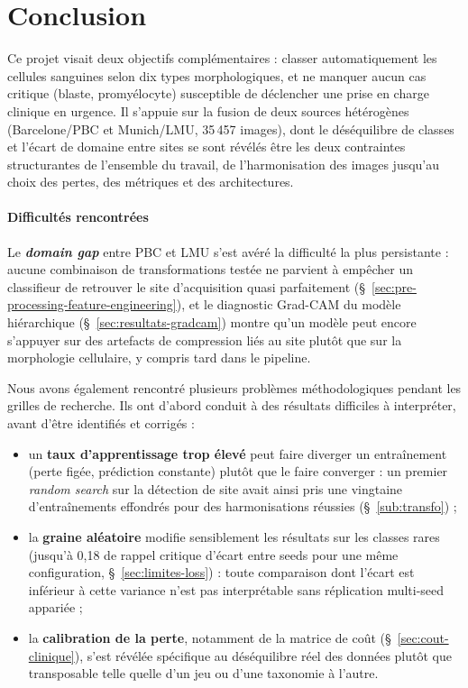 \section{Conclusion}

Ce projet visait deux objectifs complémentaires : classer automatiquement les cellules sanguines selon dix types morphologiques, et ne manquer aucun cas critique (blaste, promyélocyte) susceptible de déclencher une prise en charge clinique en urgence.
Il s'appuie sur la fusion de deux sources hétérogènes (Barcelone/PBC et Munich/LMU, 35\,457 images), dont le déséquilibre de classes et l'écart de domaine entre sites se sont révélés être les deux contraintes structurantes de l'ensemble du travail, de l'harmonisation des images jusqu'au choix des pertes, des métriques et des architectures.

\paragraph{Difficultés rencontrées}

Le \textbf{\emph{domain gap}} entre PBC et LMU s'est avéré la difficulté la plus persistante : aucune combinaison de transformations testée ne parvient à empêcher un classifieur de retrouver le site d'acquisition quasi parfaitement (\S~\ref{sec:pre-processing-feature-engineering}), et le diagnostic Grad-CAM du modèle hiérarchique (\S~\ref{sec:resultats-gradcam}) montre qu'un modèle peut encore s'appuyer sur des artefacts de compression liés au site plutôt que sur la morphologie cellulaire, y compris tard dans le pipeline.

Nous avons également rencontré plusieurs problèmes méthodologiques pendant les grilles de recherche. Ils ont d’abord conduit à des résultats difficiles à interpréter, avant d’être identifiés et corrigés :
\begin{itemize}
  \item un \textbf{taux d'apprentissage trop élevé} peut faire diverger un entraînement (perte figée, prédiction constante) plutôt que le faire converger : un premier \emph{random search} sur la détection de site avait ainsi pris une vingtaine d'entraînements effondrés pour des harmonisations réussies (\S~\ref{sub:transfo}) ;
  \item la \textbf{graine aléatoire} modifie sensiblement les résultats sur les classes rares (jusqu'à 0,18 de rappel critique d'écart entre seeds pour une même configuration, \S~\ref{sec:limites-loss}) : toute comparaison dont l'écart est inférieur à cette variance n'est pas interprétable sans réplication multi-seed appariée ;
  \item la \textbf{calibration de la perte}, notamment de la matrice de coût (\S~\ref{sec:cout-clinique}), s'est révélée spécifique au déséquilibre réel des données plutôt que transposable telle quelle d'un jeu ou d'une taxonomie à l'autre.
\end{itemize}

